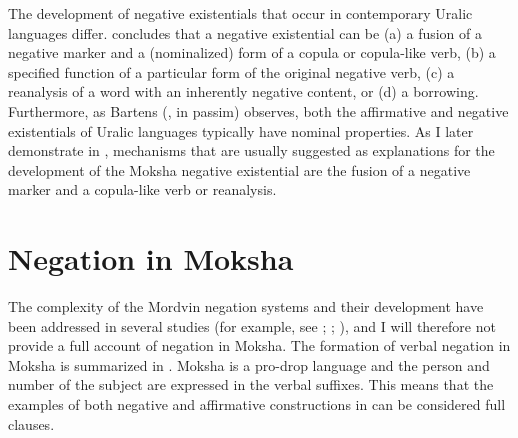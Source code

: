 \documentclass[output=paper]{langsci/langscibook}
\begin{document}
  The development of negative existentials that occur in contemporary Uralic languages differ. \citet[566--567]{Veselinova2015} concludes that a negative existential can be (a) a fusion of a negative marker and a (nominalized) form of a copula or copula-like verb, (b) a specified function of a particular form of the original negative verb, (c) a reanalysis of a word with an inherently negative content, or (d) a borrowing. Furthermore, as Bartens (\citeyear{Bartens1996}, in passim) observes, both the affirmative and negative existentials of Uralic languages typically have nominal properties. As I later demonstrate in , mechanisms that are usually suggested as explanations for the development of the Moksha negative existential are the fusion of a negative marker and a copula-like verb or reanalysis.

\section{Negation in Moksha}\label{sec:2:4}

The complexity of the Mordvin negation systems and their development have been addressed in several studies (for example, see \citealt[140--144]{Bartens1999}; \citealt[87--87]{Keresztes2011}; \citealt{Hamari2007,Hamari2011,Hamari2013}), and I will therefore not provide a full account of negation in Moksha. The formation of verbal negation in Moksha is summarized in . Moksha is a pro-drop language and the person and number of the subject are expressed in the verbal suffixes. This means that the examples of both negative and affirmative constructions in  can be considered full clauses.
\end{document}
